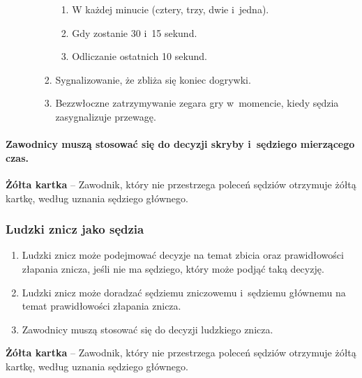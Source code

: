 \documentclass[12pt]{article}
\newcommand\yellowcard[1]{\bgroup\textcolor{darkyellow}{\textbf{#1}}}
\begin{document}
\begin{enumerate}
\begin{enumerate}
\begin{enumerate}
			                  \begin{enumerate}
				                  \item
				                        W każdej minucie (cztery, trzy, dwie i~jedna).
				                  \item
				                        Gdy zostanie 30 i~15 sekund.
				                  \item
				                        Odliczanie ostatnich 10 sekund.
			                  \end{enumerate}
			            \item
			                  Sygnalizowanie, że zbliża się koniec dogrywki.
			            \item
			                  Bezzwłoczne zatrzymywanie zegara gry w~momencie, kiedy sędzia
			                  zasygnalizuje przewagę.
		            \end{enumerate}
	      \end{enumerate}
\end{enumerate}

\paragraph{Zawodnicy muszą stosować się do decyzji skryby i~sędziego mierzącego czas.}

\yellowcard{Żółta kartka} -- Zawodnik, który nie przestrzega poleceń sędziów
otrzymuje żółtą kartkę, według uznania sędziego głównego.

\subsubsection{Ludzki znicz jako sędzia}

\begin{enumerate}
	\item Ludzki znicz może podejmować decyzje na temat zbicia oraz
	      prawidłowości złapania znicza, jeśli nie ma sędziego, który może podjąć
	      taką decyzję.

	\item Ludzki znicz może doradzać sędziemu zniczowemu i~sędziemu głównemu na
	      temat prawidłowości złapania znicza.

	\item Zawodnicy muszą stosować się do decyzji ludzkiego znicza.
\end{enumerate}

\yellowcard{Żółta kartka} -- Zawodnik, który nie przestrzega poleceń sędziów
otrzymuje żółtą kartkę, według uznania sędziego głównego.
\end{document}
